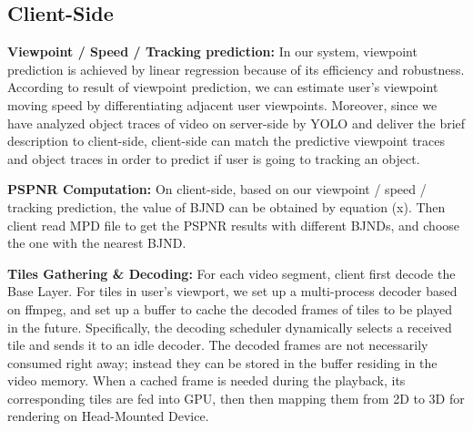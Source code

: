 \subsection{Client-Side}

\textbf{Viewpoint / Speed / Tracking prediction:} In our system, viewpoint prediction is achieved by linear regression because of its efficiency and robustness. According to result of viewpoint prediction, we can estimate user's viewpoint moving speed by differentiating adjacent user viewpoints. Moreover, since we have analyzed object traces of video on server-side by YOLO \cite{yolo} and deliver the brief description to client-side, client-side can match the predictive viewpoint traces and object traces in order to predict if user is going to tracking an object.

\textbf{PSPNR Computation:} On client-side, based on our viewpoint / speed / tracking prediction, the value of BJND can be obtained by equation (x). Then client read MPD file to get the PSPNR results with different BJNDs, and choose the one with the nearest BJND.

\textbf{Tiles Gathering \& Decoding:} For each video segment, client first decode the Base Layer. For tiles in user's viewport, we set up a multi-process decoder based on ffmpeg, and set up a buffer to cache the decoded frames of tiles to be played in the future. Specifically, the decoding scheduler dynamically selects a received tile and sends it to an idle decoder. The decoded frames are not necessarily consumed right away; instead they can be stored in the buffer residing in the video memory. When a cached frame is needed during the playback, its corresponding tiles are fed into GPU, then then mapping them from 2D to 3D for rendering on Head-Mounted Device.